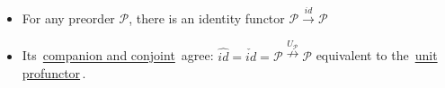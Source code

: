 \begin{itemize}
    \item For any preorder $\mathcal{P}$, there is an identity functor $\mathcal{P}\xrightarrow{id}\mathcal{P}$
    \item Its \,\href{doc/1 math/Seven Sketches in Compositionality/Chapter 4: Co-design/3 Categories of profunctors/3 Fun profunctor facts - companions, conjoints, collages/1 Companion and conjoint}{companion and conjoint}\, agree: $\hat{id}=\check{id}=\mathcal{P}\overset{U_\mathcal{P}}\nrightarrow \mathcal{P}$ equivalent to the \,\href{doc/1 math/Seven Sketches in Compositionality/Chapter 4: Co-design/3 Categories of profunctors/2 The categories V-Prof and Feas/3 The unit profunctor}{unit profunctor}\,.
  \end{itemize}
